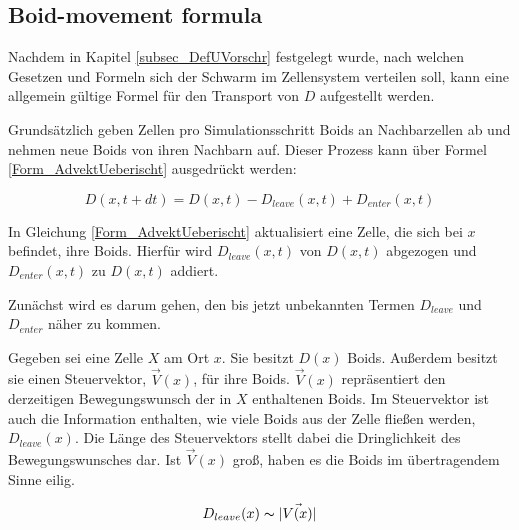 \documentclass[a4paper, 10pt, journal]{wissarbIEEE}      %
\newcommand{\length}[1]{\lvert \vec{#1} \rvert}
\begin{document}
\subsection{Boid-movement formula}
Nachdem in Kapitel \ref{subsec_DefUVorschr} festgelegt wurde, nach welchen Gesetzen und Formeln sich der Schwarm im Zellensystem verteilen soll, kann eine allgemein gültige Formel für den Transport von $D$ aufgestellt werden.

Grundsätzlich geben Zellen pro Simulationsschritt Boids an Nachbarzellen ab und nehmen neue Boids von ihren Nachbarn auf. Dieser Prozess kann über Formel \ref{Form_AdvektUeberischt} ausgedrückt werden:

\begin{equation}
D(x,t+dt) = D(x,t)-D_{leave}(x,t) + D_{enter}(x,t)
\label{Form_AdvektUeberischt}
\end{equation}

In Gleichung \ref{Form_AdvektUeberischt} aktualisiert eine Zelle, die sich bei $x$ befindet, ihre Boids. Hierfür wird $D_{leave}(x,t)$ von $D(x,t)$ abgezogen und $D_{enter}(x,t)$ zu $D(x,t)$ addiert.

Zunächst wird es darum gehen, den bis jetzt unbekannten Termen  $D_{leave}$ und $D_{enter}$ näher zu kommen.



Gegeben sei eine Zelle $X$ am Ort $x$. Sie besitzt $D(x)$ Boids. Außerdem besitzt sie einen Steuervektor, $\vec{V}(x)$, für ihre Boids. $\vec{V}(x)$ repräsentiert den derzeitigen  Bewegungswunsch der in $X$ enthaltenen Boids. Im Steuervektor ist auch die Information enthalten, wie viele Boids aus der Zelle fließen werden, $D_{leave}(x)$. Die Länge des Steuervektors stellt dabei die Dringlichkeit des Bewegungswunsches dar. Ist $\vec{V}(x)$ groß, haben es die Boids im übertragendem Sinne eilig. 

\begin{equation}
D_{leave}(x) \thicksim \length{V(x)}
\label{Form_DLeavePropV}
\end{equation}
\end{document}
